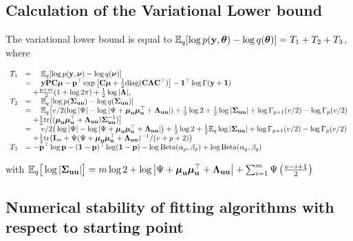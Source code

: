\documentclass{article}[12pt]
\begin{document}
\subsection{Calculation of the Variational Lower bound}

The variational lower bound is equal to ${\mathbb E}_q[\log{p({\bf y}, {\boldsymbol\theta})} - \log{q({\boldsymbol\theta})}] = T_1 + T_2 + T_3$,
where

$$
\begin{array}{rl}
T_1 &= \quad {\mathbb E}_q[\log{p({\bf y}, {\boldsymbol\nu})} - \log{q({\boldsymbol\nu})}] \\
&= \quad {\bf y} {\bf P} {\bf C} {\boldsymbol\mu} - {\bf p}^\top \exp{\left[ {\bf C}{\boldsymbol\mu}+ {\tfrac{1}{2}}\text{diag} ({\bf C}{\boldsymbol\Lambda}{\bf C}^\top) \right]} - {\bf 1}^\top\log \Gamma{({\bf y}+ {\bf1})}\\
& \quad + \frac{p + m}{2} (1 + \log{2 \pi}) + {\tfrac{1}{2}} \log{|{\boldsymbol\Lambda}|}, \\
T_2 &= \quad {\mathbb E}_q \left[ \log p({\boldsymbol \Sigma}_{{\bf u} {\bf u}}) - \log q({\boldsymbol \Sigma}_{{\bf u} {\bf u}}) \right] \\
&= \quad {\mathbb E}_q \big[ v/2(\log |\Psi| - \log |\Psi + {\boldsymbol \mu}_{\bf u} {\boldsymbol \mu}_{\bf u}^\top + {\boldsymbol \Lambda}_{{\bf u} {\bf u}}|) + {\tfrac{1}{2}} \log 2 + {\tfrac{1}{2}} \log|{\boldsymbol \Sigma}_{{\bf u} {\bf u}}| + \log \Gamma_{p+1}(v/2) - \log \Gamma_{p}(v/2)\\
&\quad + {\tfrac{1}{2}} \text{tr}(({\boldsymbol \mu}_{{\bf u}} {\boldsymbol \mu}_{{\bf u}}^\top + {\boldsymbol \Lambda}_{{\bf u} {\bf u}}) {\boldsymbol \Sigma}_{{\bf u} {\bf u}}^{-1}) \big] \\
&= \quad v/2\big(\log |\Psi| - \log |\Psi + {\boldsymbol \mu}_{\bf u} {\boldsymbol \mu}_{\bf u}^\top + {\boldsymbol \Lambda}_{{\bf u} {\bf u}}|\big) + {\tfrac{1}{2}} \log 2 + {\tfrac{1}{2}} {\mathbb E}_q \log |{\boldsymbol \Sigma}_{{\bf u} {\bf u}}| + \log \Gamma_{p+1}(v/2) - \log \Gamma_{p}(v/2) \\
&\quad + {\tfrac{1}{2}} \text{tr}\big({\bf I}_m + \Psi(\Psi+ {\boldsymbol \mu}_{\bf u} {\boldsymbol \mu}_{\bf u}^\top + {\boldsymbol \Lambda}_{{\bf u} {\bf u}})^{-1}/(v + p + 2)\big) \\
T_3 &= - {\bf p}^\top \log {\bf p} - ({\bf 1} - {\bf p})^\top \log ({\bf 1} - {\bf p}) - \log \text{Beta} (\alpha_\rho, \beta_\rho) + \log \text{Beta} (\alpha_q, \beta_q)
\end{array}
$$

with ${\mathbb E}_q \big[ \log |{\boldsymbol \Sigma}_{{\bf u} {\bf u}}| \big] = m \log 2 + \log \left | \Psi + {\boldsymbol \mu}_{\bf u} {\boldsymbol \mu}_{\bf u}^\top + {\boldsymbol \Lambda}_{{\bf u} {\bf u}} \right | + \sum_{i=1}^m \Psi \left ( \frac{v - i + 1}{2} \right )$

\subsection{Numerical stability of fitting algorithms with respect to starting point}




\end{document}
